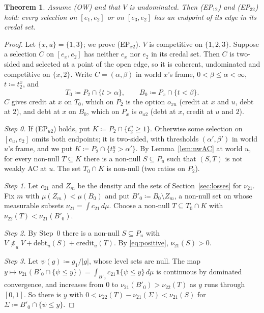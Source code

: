 \documentclass[11pt]{article}
\newtheorem{theorem}{Theorem}
\theoremstyle{definition}\newtheorem{definition}[theorem]{Definition}
\theoremstyle{remark}\newtheorem{remark}[theorem]{Remark}
\newcommand{\debt}{\mathrm{debt}}
\newcommand{\cred}{\mathrm{credit}}
\begin{document}
\begin{theorem}\label{thm:EP}
Assume (OW) and that $V$ is undominated. Then (EP$_{12}$) and (EP$_{32}$)
hold: every selection on $[e_1,e_2]$ or on $[e_3,e_2]$ has an endpoint of
its edge in its credal set.
\end{theorem}
\begin{proof}
Let $\{x,u\}=\{1,3\}$; we prove (EP$_{x2}$). $V$ is competitive on
$\{1,2,3\}$. Suppose a selection $C$ on $[e_x,e_2]$ has neither $e_x$ nor
$e_2$ in its credal set. Then $C$ is two-sided and selected at a point of
the open edge, so it is coherent, undominated and competitive on $\{x,2\}$.
Write $C=(\alpha,\beta)$ in world $x$'s frame, $0<\beta\le\alpha<\infty$,
$t\coloneqq t^x_2$, and
\[
 T_0\coloneqq P_2\cap\{t>\alpha\},\qquad B_0\coloneqq P_x\cap\{t<\beta\}.
\]
$C$ gives credit at $x$ on $T_0$, which on $P_2$ is the option $o_{xu}$
(credit at $x$ and $u$, debt at $2$), and debt at $x$ on $B_0$, which on
$P_x$ is $o_{u2}$ (debt at $x$, credit at $u$ and $2$).

\emph{Step 0.} If (EP$_{u2}$) holds, put $K\coloneqq P_2\cap\{t^u_2\ge1\}$.
Otherwise some selection on $[e_u,e_2]$ omits both endpoints; it is
two-sided, with thresholds $(\alpha',\beta')$ in world $u$'s frame, and we
put $K\coloneqq P_2\cap\{t^u_2>\alpha'\}$. By Lemma~\ref{lem:nwAC} at
world $u$, for every non-null $T\subseteq K$ there is a non-null
$S\subseteq P_u$ such that $(S,T)$ is not weakly AC at $u$. The set
$T_0\cap K$ is non-null (two ratios on $P_2$).

\emph{Step 1.} Let $c_{21}$ and $Z_m$ be the density and the sets of
Section~\ref{sec:losses} for $\nu_{21}$. Fix $m$ with $\mu(Z_m)<\mu(B_0)$
and put $B'_0\coloneqq B_0\setminus Z_m$, a non-null set on whose measurable
subsets $\nu_{21}=\int c_{21}\,d\mu$. Choose a non-null $T\subseteq T_0\cap
K$ with $\nu_{22}(T)<\nu_{21}(B'_0)$.

\emph{Step 2.} By Step~0 there is a non-null $S\subseteq P_u$ with
$V\not\preceq_uV+\debt_u(S)+\cred_u(T)$. By \eqref{eq:positive},
$\nu_{21}(S)>0$.

\emph{Step 3.} Let $\psi(g)\coloneqq g_1/|g|$, whose level sets are null.
The map $y\mapsto\nu_{21}(B'_0\cap\{\psi\le y\})=\int_{B'_0}
c_{21}\mathbf 1\{\psi\le y\}\,d\mu$ is continuous by dominated convergence,
and increases from $0$ to $\nu_{21}(B'_0)>\nu_{22}(T)$ as $y$ runs through
$[0,1]$. So there is $y$ with
$0<\nu_{22}(T)-\nu_{21}(\Sigma)<\nu_{21}(S)$ for
$\Sigma\coloneqq B'_0\cap\{\psi\le y\}$.


\end{proof}
\end{document}
